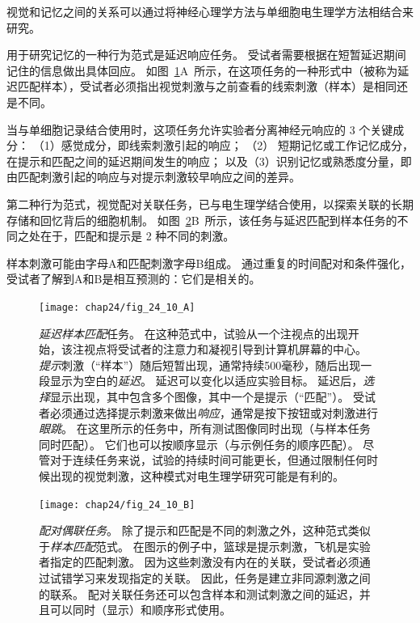 \begin{proposition}[视觉与工作记忆的相互作用研究] \label{box:24_1}
	
	\quad \quad 视觉和记忆之间的关系可以通过将神经心理学方法与单细胞电生理学方法相结合来研究。
	
	\quad \quad 用于研究记忆的一种行为范式是延迟响应任务。
	受试者需要根据在短暂延迟期间记住的信息做出具体回应。
	如图~\ref{fig:24_10_a}A~所示，在这项任务的一种形式中（被称为延迟匹配样本），受试者必须指出视觉刺激与之前查看的线索刺激（样本）是相同还是不同。
	
	\quad \quad 当与单细胞记录结合使用时，这项任务允许实验者分离神经元响应的 3 个关键成分：
	（1）感觉成分，即线索刺激引起的响应；
	（2） 短期记忆或工作记忆成分，在提示和匹配之间的延迟期间发生的响应；
	以及（3）识别记忆或熟悉度分量，即由匹配刺激引起的响应与对提示刺激较早响应之间的差异。
	
	\quad \quad 第二种行为范式，视觉配对关联任务，已与电生理学结合使用，以探索关联的长期存储和回忆背后的细胞机制。
	如图~\ref{fig:24_10_b}B~所示，该任务与延迟匹配到样本任务的不同之处在于，匹配和提示是 2 种不同的刺激。
	
	\quad \quad 样本刺激可能由字母A和匹配刺激字母B组成。
	通过重复的时间配对和条件强化，受试者了解到A和B是相互预测的：它们是相关的。
	
\end{proposition}


\begin{figure}[htbp]
	\centering
	\texttt{[image: chap24/fig\_24\_10\_A]}
	\caption{\textit{延迟样本匹配}任务。
		在这种范式中，试验从一个注视点的出现开始，该注视点将受试者的注意力和凝视引导到计算机屏幕的中心。
		\textit{提示}刺激（“样本”）随后短暂出现，通常持续500毫秒，随后出现一段显示为空白的\textit{延迟}。
		延迟可以变化以适应实验目标。
		延迟后，\textit{选择}显示出现，其中包含多个图像，其中一个是提示（“匹配”）。
		受试者必须通过选择提示刺激来做出\textit{响应}，通常是按下按钮或对刺激进行\textit{眼跳}。
		在这里所示的任务中，所有测试图像同时出现（与样本任务同时匹配）。
		它们也可以按顺序显示（与示例任务的顺序匹配）。
		尽管对于连续任务来说，试验的持续时间可能更长，但通过限制任何时候出现的视觉刺激，这种模式对电生理学研究可能是有利的。}
	\label{fig:24_10_a}
\end{figure}


\begin{figure}[htbp]
	\centering
	\texttt{[image: chap24/fig\_24\_10\_B]}
	\caption{\textit{配对偶联任务}。
		除了提示和匹配是不同的刺激之外，这种范式类似于\textit{样本匹配}范式。
		在图示的例子中，篮球是提示刺激，飞机是实验者指定的匹配刺激。
		因为这些刺激没有内在的关联，受试者必须通过试错学习来发现指定的关联。
		因此，任务是建立非同源刺激之间的联系。
		配对关联任务还可以包含样本和测试刺激之间的延迟，并且可以同时（显示）和顺序形式使用。}
	\label{fig:24_10_b}
\end{figure}


